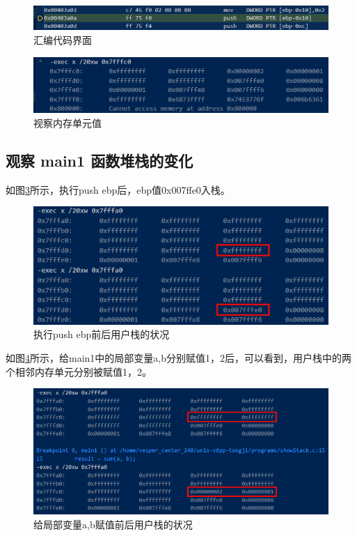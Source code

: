 \begin{figure}[!htbp]
    \centering
    \includegraphics[width=\textwidth]{figures/discode.png}
    \caption{汇编代码界面}\label{discode}
\end{figure}

\begin{figure}[!htbp]
    \centering
    \includegraphics[scale=1]{figures/exec.png}
    \caption{视察内存单元值}\label{exec}
\end{figure}
\clearpage
\subsection{观察 main1 函数堆栈的变化}
如图\ref{entermainBFPushEBP}所示，执行push ebp后，ebp值0x007ffe0入栈。

\begin{figure}[!h]
    \centering
    \includegraphics[scale=1]{figures/entermainBFPushEBP.png}
    \caption{执行push ebp前后用户栈的状况}\label{entermainBFPushEBP}
\end{figure}

如图\ref{BFValue}所示，给main1中的局部变量a,b分别赋值1，2后，可以看到，用户栈中的两个相邻内存单元分别被赋值1，2。

\begin{figure}[!htbp]
    \centering
    \includegraphics[width=\textwidth]{figures/BFValue.png}
    \caption{给局部变量a,b赋值前后用户栈的状况}\label{BFValue}
\end{figure}

